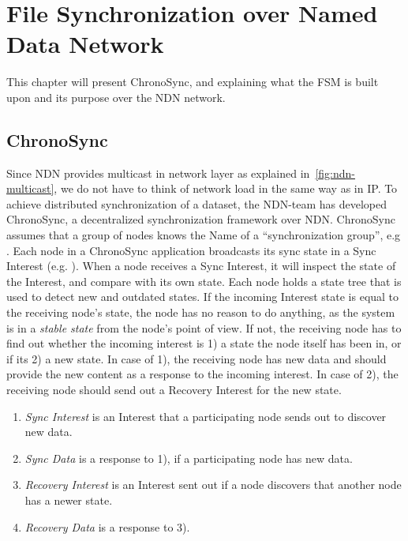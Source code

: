 \chapter{File Synchronization over Named Data Network}\label{chp3:application}
This chapter will present ChronoSync, and explaining what the \gls{FSM} is built upon and its purpose over the \gls{NDN} network. 


\section{ChronoSync}\label{chronosync}
Since \gls{NDN} provides multicast in network layer as explained in~\autoref{fig:ndn-multicast}, we do not have to think of network load in the same way as in \gls{IP}.  
To achieve distributed synchronization of a dataset, the \gls{NDN}-team has developed ChronoSync, a decentralized synchronization framework over \gls{NDN}. 
ChronoSync assumes that a group of nodes knows the Name of a ``synchronization group'', e.g .
Each node in a ChronoSync application broadcasts its sync state in a Sync Interest (e.g. ).
When a node receives a Sync Interest, it will inspect the state of the Interest, and compare with its own state.
Each node holds a state tree that is used to detect new and outdated states.
If the incoming Interest state is equal to the receiving node's state, the node has no reason to do anything, as the system is in a \textit{stable state} from the node's point of view.
If not, the receiving node has to find out whether the incoming interest is 1) a state the node itself has been in, or if its 2) a new state.
In case of 1), the receiving node has new data and should provide the new content as a response to the incoming interest. In case of 2), the receiving node should send out a Recovery Interest for the new state.

\begin{enumerate}
  \item \textit{Sync Interest} is an Interest that a participating node sends out to discover new data.
  \item \textit{Sync Data} is a response to 1), if a participating node has new data.
  \item \textit{Recovery Interest} is an Interest sent out if a node discovers that another node has a newer state.
  \item \textit{Recovery Data} is a response to 3).
\end{enumerate}

